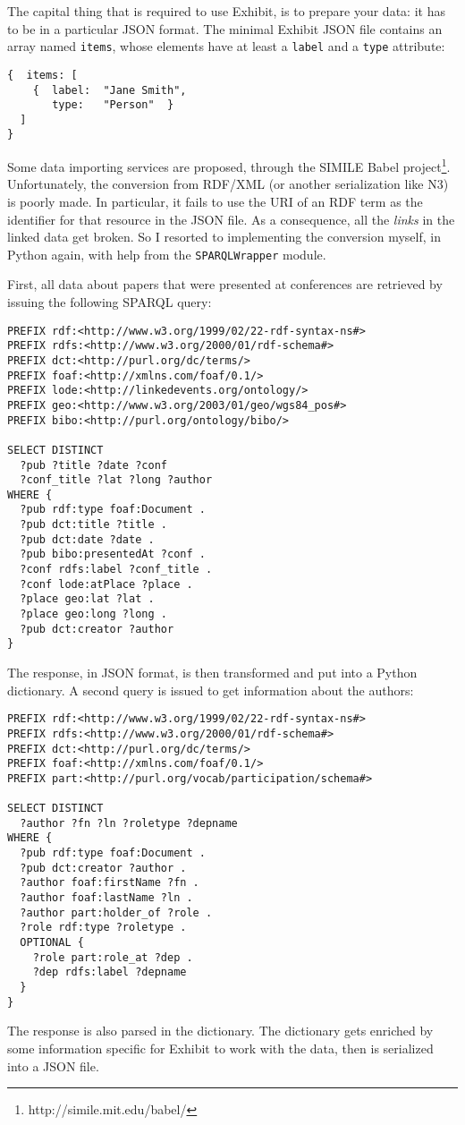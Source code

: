 \documentclass[a4paper,11pt]{report}
\begin{document}
The capital thing that is required to use Exhibit, is to prepare your data: it has to be in a particular JSON format. The minimal Exhibit JSON file contains an array named \texttt{items}, whose elements have at least a \texttt{label} and a \texttt{type} attribute:
\begin{verbatim}
{  items: [
    {  label:  "Jane Smith",
       type:   "Person"  }
  ]
}
\end{verbatim}

Some data importing services are proposed, through the SIMILE Babel project\footnote{http://simile.mit.edu/babel/}. Unfortunately, the conversion from RDF/XML (or another serialization like N3) is poorly made. In particular, it fails to use the URI of an RDF term as the identifier for that resource in the JSON file. As a consequence, all the \emph{links} in the linked data get broken. So I resorted to implementing the conversion myself, in Python again, with help from the \texttt{SPARQLWrapper} module. 

First, all data about papers that were presented at conferences are retrieved by issuing the following SPARQL query:
\begin{verbatim}
PREFIX rdf:<http://www.w3.org/1999/02/22-rdf-syntax-ns#>
PREFIX rdfs:<http://www.w3.org/2000/01/rdf-schema#>
PREFIX dct:<http://purl.org/dc/terms/>
PREFIX foaf:<http://xmlns.com/foaf/0.1/>
PREFIX lode:<http://linkedevents.org/ontology/>
PREFIX geo:<http://www.w3.org/2003/01/geo/wgs84_pos#>
PREFIX bibo:<http://purl.org/ontology/bibo/>

SELECT DISTINCT 
  ?pub ?title ?date ?conf 
  ?conf_title ?lat ?long ?author
WHERE {
  ?pub rdf:type foaf:Document .
  ?pub dct:title ?title .
  ?pub dct:date ?date .
  ?pub bibo:presentedAt ?conf .
  ?conf rdfs:label ?conf_title .
  ?conf lode:atPlace ?place .
  ?place geo:lat ?lat .
  ?place geo:long ?long .
  ?pub dct:creator ?author
}
\end{verbatim}
The response, in JSON format, is then transformed and put into a Python dictionary. A second query is issued to get information about the authors: 
\begin{verbatim}
PREFIX rdf:<http://www.w3.org/1999/02/22-rdf-syntax-ns#>
PREFIX rdfs:<http://www.w3.org/2000/01/rdf-schema#>
PREFIX dct:<http://purl.org/dc/terms/>
PREFIX foaf:<http://xmlns.com/foaf/0.1/>
PREFIX part:<http://purl.org/vocab/participation/schema#>

SELECT DISTINCT 
  ?author ?fn ?ln ?roletype ?depname
WHERE {
  ?pub rdf:type foaf:Document .
  ?pub dct:creator ?author .
  ?author foaf:firstName ?fn .
  ?author foaf:lastName ?ln .
  ?author part:holder_of ?role . 
  ?role rdf:type ?roletype . 
  OPTIONAL {
    ?role part:role_at ?dep . 
    ?dep rdfs:label ?depname
  }
}\end{verbatim}
The response is also parsed in the dictionary. The dictionary gets enriched by some information specific for Exhibit to work with the data, then is serialized into a JSON file. 
\end{document}
